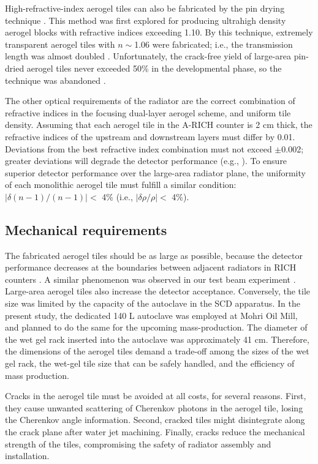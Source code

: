 \documentclass[5p,twocolumn]{elsarticle}
\begin{document}
High-refractive-index aerogel tiles can also be fabricated by the pin drying technique \cite{cite4}. This method was first explored for producing ultrahigh density aerogel blocks with refractive indices exceeding 1.10. By this technique, extremely transparent aerogel tiles with $n \sim $1.06 were fabricated; i.e., the transmission length was almost doubled \cite{cite11}. Unfortunately, the crack-free yield of large-area pin-dried aerogel tiles never exceeded 50\% in the developmental phase, so the technique was abandoned \cite{cite16}.

The other optical requirements of the radiator are the correct combination of refractive indices in the focusing dual-layer aerogel scheme, and uniform tile density. Assuming that each aerogel tile in the A-RICH counter is 2 cm thick, the refractive indices of the upstream and downstream layers must differ by 0.01. Deviations from the best refractive index combination must not exceed $\pm $0.002; greater deviations will degrade the detector performance (e.g., \cite{citeS9,citeS10}). To ensure superior detector performance over the large-area radiator plane, the uniformity of each monolithic aerogel tile must fulfill a similar condition: $|\delta (n - 1)/(n - 1)| <$ 4\% (i.e., $|\delta \rho /\rho| <$ 4\%).

\subsection{Mechanical requirements}
\label{s3}

The fabricated aerogel tiles should be as large as possible, because the detector performance decreases at the boundaries between adjacent radiators in RICH counters \cite{citeS11}. A similar phenomenon was observed in our test beam experiment \cite{citeS9,citeS12}. Large-area aerogel tiles also increase the detector acceptance. Conversely, the tile size was limited by the capacity of the autoclave in the SCD apparatus. In the present study, the dedicated 140 L autoclave was employed at Mohri Oil Mill, and planned to do the same for the upcoming mass-production. The diameter of the wet gel rack inserted into the autoclave was approximately 41 cm. Therefore, the dimensions of the aerogel tiles demand a trade-off among the sizes of the wet gel rack, the wet-gel tile size that can be safely handled, and the efficiency of mass production.

Cracks in the aerogel tile must be avoided at all costs, for several reasons. First, they cause unwanted scattering of Cherenkov photons in the aerogel tile, losing the Cherenkov angle information. Second, cracked tiles might disintegrate along the crack plane after water jet machining. Finally, cracks reduce the mechanical strength of the tiles, compromising the safety of radiator assembly and installation.
\end{document}
